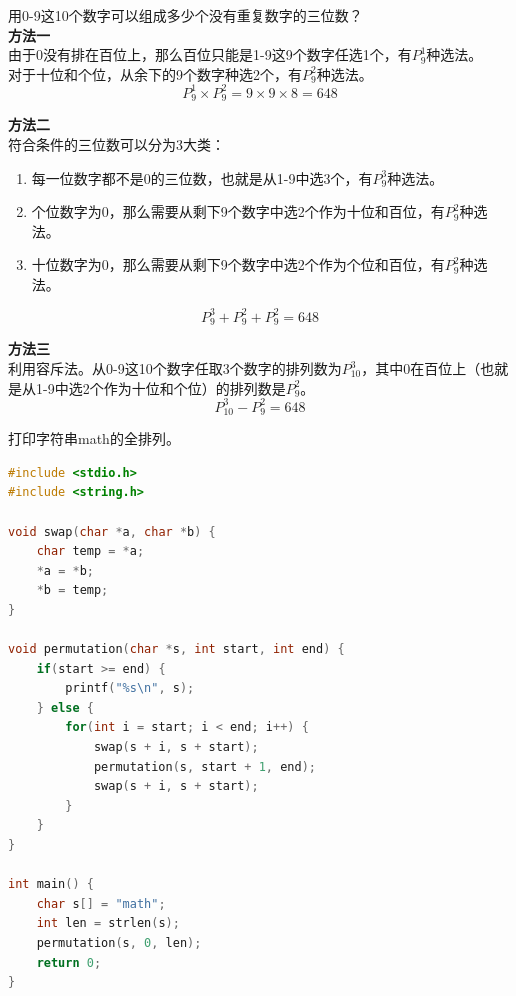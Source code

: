 \documentclass[12pt, openany, oneside]{book}
\begin{document}
\begin{tcolorbox}
	用0-9这10个数字可以组成多少个没有重复数字的三位数？ \\

	\textbf{方法一} \\
	由于0没有排在百位上，那么百位只能是1-9这9个数字任选1个，有$ P_9^1 $种选法。 \\
	对于十位和个位，从余下的9个数字种选2个，有$ P_9^2 $种选法。
	$$
		P_9^1 \times P_9^2 = 9 \times 9 \times 8 = 648
	$$

	\textbf{方法二} \\
	符合条件的三位数可以分为3大类：
	\begin{enumerate}
		\item 每一位数字都不是0的三位数，也就是从1-9中选3个，有$ P_9^3 $种选法。

		\item 个位数字为0，那么需要从剩下9个数字中选2个作为十位和百位，有$ P_9^2 $种选法。

		\item 十位数字为0，那么需要从剩下9个数字中选2个作为个位和百位，有$ P_9^2 $种选法。
	\end{enumerate}
	$$
		P_9^3 + P_9^2 + P_9^2 = 648
	$$

	\textbf{方法三} \\
	利用容斥法。从0-9这10个数字任取3个数字的排列数为$ P_{10}^3 $，其中0在百位上（也就是从1-9中选2个作为十位和个位）的排列数是$ P_9^2 $。
	$$
		P_{10}^3 - P_9^2 = 648
	$$
\end{tcolorbox}

\begin{tcolorbox}
	打印字符串math的全排列。
\end{tcolorbox}

\begin{lstlisting}[language=C, title=全排列]
#include <stdio.h>
#include <string.h>

void swap(char *a, char *b) {
	char temp = *a;
	*a = *b;
	*b = temp;
}

void permutation(char *s, int start, int end) {
	if(start >= end) {
		printf("%s\n", s);
	} else {
		for(int i = start; i < end; i++) {
			swap(s + i, s + start);
			permutation(s, start + 1, end);
			swap(s + i, s + start);
		}
	}
}

int main() {
	char s[] = "math";
	int len = strlen(s);
	permutation(s, 0, len);
	return 0;
}
\end{lstlisting}

\newpage
\end{document}
